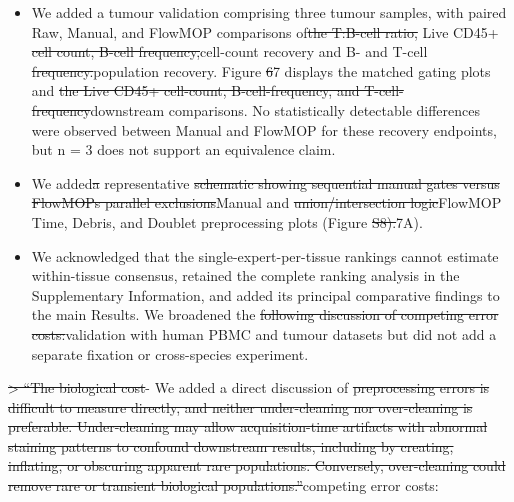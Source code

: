 \documentclass[
  11pt,
  a4paper,
]{article}
\begin{document}
\begin{itemize}
\item
  We added a tumour validation comprising three tumour samples, with
  paired Raw, Manual, and FlowMOP comparisons
  of{\color{revisionred}\sout{the T:B-cell ratio,}} Live CD45+
  {\color{revisionred}\sout{cell count, B-cell
  frequency,}}{\color{revisionblue}cell-count recovery and B-} and
  T-cell
  {\color{revisionred}\sout{frequency.}}{\color{revisionblue}population
  recovery.} Figure {\color{revisionred}\sout{6}}{\color{revisionblue}7}
  displays the matched gating plots and {\color{revisionred}\sout{the
  Live CD45+ cell-count, B-cell-frequency, and
  T-cell-frequency}}{\color{revisionblue}downstream} comparisons.
  {\color{revisionblue}No statistically detectable differences were
  observed between Manual and FlowMOP for these recovery endpoints, but
  n = 3 does not support an equivalence claim.}
\item
  We added{\color{revisionred}\sout{a}} representative
  {\color{revisionred}\sout{schematic showing sequential manual gates
  versus FlowMOP\textquotesingle s parallel
  exclusions}}{\color{revisionblue}Manual} and
  {\color{revisionred}\sout{union/intersection
  logic}}{\color{revisionblue}FlowMOP Time, Debris, and Doublet
  preprocessing plots} (Figure
  {\color{revisionred}\sout{S8).}}{\color{revisionblue}7A).}
\item
  We {\color{revisionblue}acknowledged that the single-expert-per-tissue
  rankings cannot estimate within-tissue consensus, retained the
  complete ranking analysis in the Supplementary Information, and} added
  {\color{revisionblue}its principal comparative findings to the main
  Results. We broadened} the {\color{revisionred}\sout{following
  discussion of competing error costs:}}{\color{revisionblue}validation
  with human PBMC and tumour datasets but did not add a separate
  fixation or cross-species experiment.}
\end{itemize}

{\color{revisionred}\sout{\textgreater{} ``The biological
cost}}{\color{revisionblue}- We added a direct discussion} of
{\color{revisionred}\sout{preprocessing errors is difficult to measure
directly, and neither under-cleaning nor over-cleaning is preferable.
Under-cleaning may allow acquisition-time artifacts with abnormal
staining patterns to confound downstream results, including by creating,
inflating, or obscuring apparent rare populations. Conversely,
over-cleaning could remove rare or transient biological
populations.''}}{\color{revisionblue}competing error costs:}
\end{document}

